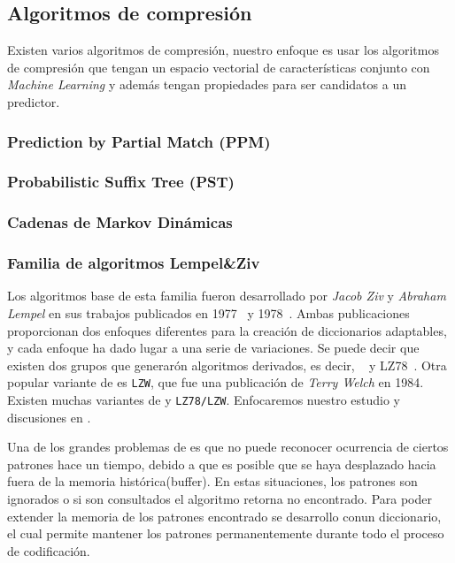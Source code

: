 \uncm
\subsection{Algoritmos de compresión}

Existen varios algoritmos de compresión, nuestro enfoque es usar los algoritmos de compresión que tengan un espacio vectorial de características conjunto con \emph{Machine Learning} y además tengan propiedades para ser candidatos a un predictor. 


\subsubsection{Prediction by Partial Match (PPM)}
	
 
\subsubsection{Probabilistic Suffix Tree (PST)}
 	

\subsubsection{Cadenas de Markov Dinámicas}
  	
 


\subsubsection{Familia de algoritmos Lempel\&Ziv}

 
Los algoritmos base de esta familia fueron desarrollado por \emph{Jacob Ziv} y \emph{Abraham Lempel} en sus trabajos publicados en 1977~\cite{ZivLempel1977} y 1978~\cite{ZivLempel1978}. Ambas publicaciones proporcionan dos enfoques diferentes para la creación de diccionarios adaptables, y cada enfoque ha dado lugar a una serie de variaciones. Se puede decir que existen dos grupos que generarón algoritmos derivados, es decir, \lzSieteSiete~\cite{ZivLempel1977} y LZ78~\cite{ZivLempel1978}. Otra popular variante  de \lzSieteOcho es \texttt{LZW}, que fue una publicación de \emph{Terry Welch} en 1984. Existen muchas variantes de \lzSieteSiete y \texttt{LZ78/LZW}. Enfocaremos nuestro estudio y discusiones en \lzSieteOcho. 


Una de los grandes problemas de \lzSieteSiete es que no puede reconocer ocurrencia de ciertos patrones hace un tiempo, debido a que es posible que se haya desplazado hacia fuera de la memoria histórica(buffer). En estas situaciones, los patrones son ignorados o si son consultados el algoritmo retorna no encontrado. Para poder extender la memoria de los patrones encontrado se desarrollo \lzSieteOcho conun diccionario, el cual permite mantener los patrones permanentemente durante todo el proceso de codificación.



